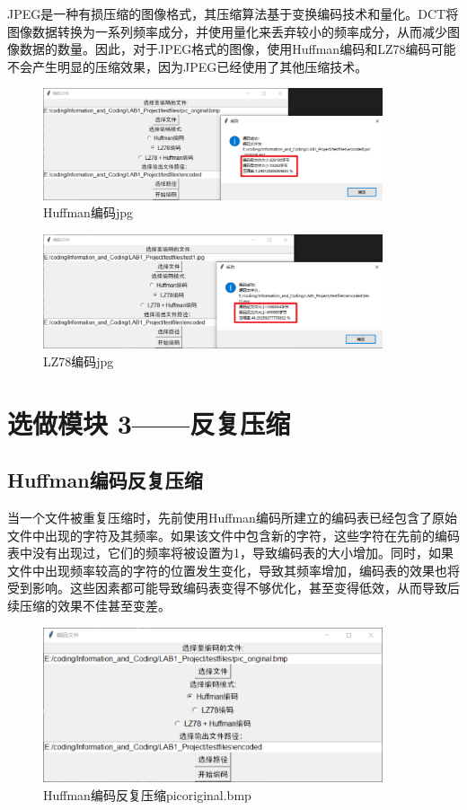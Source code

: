 \documentclass[12pt, a4paper]{ctexart}
\begin{document}
    JPEG是一种有损压缩的图像格式，其压缩算法基于变换编码技术和量化。DCT将图像数据转换为一系列频率成分，并使用量化来丢弃较小的频率成分，从而减少图像数据的数量。因此，对于JPEG格式的图像，使用Huffman编码和LZ78编码可能不会产生明显的压缩效果，因为JPEG已经使用了其他压缩技术。
    \begin{figure}[H]
    \centering
    \includegraphics[width=10cm]{./pic/10-2.png}		
    \caption{Huffman编码jpg}
    \end{figure}
    \begin{figure}[H]
    \centering
    \includegraphics[width=10cm]{./pic/10-4.png}		
    \caption{LZ78编码jpg}
    \end{figure}

\section{选做模块 3——反复压缩}

    \subsection{Huffman编码反复压缩}

    当一个文件被重复压缩时，先前使用Huffman编码所建立的编码表已经包含了原始文件中出现的字符及其频率。如果该文件中包含新的字符，这些字符在先前的编码表中没有出现过，它们的频率将被设置为1，导致编码表的大小增加。同时，如果文件中出现频率较高的字符的位置发生变化，导致其频率增加，编码表的效果也将受到影响。这些因素都可能导致编码表变得不够优化，甚至变得低效，从而导致后续压缩的效果不佳甚至变差。

    
    \begin{figure}[H]
    \centering
    \includegraphics[width=10cm]{./pic/11-0.png}		
    \caption{Huffman编码反复压缩picoriginal.bmp}
    \end{figure}
    
\end{document}
